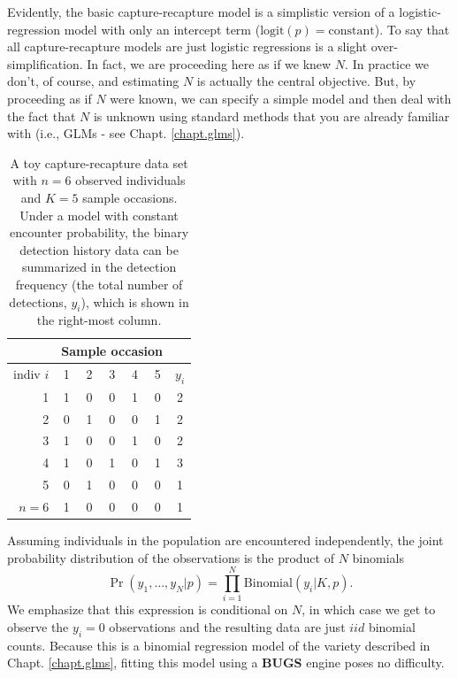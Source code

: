 Evidently, the basic capture-recapture model is a simplistic version
of a logistic-regression model with only an intercept term
($\mbox{logit}(p) = \mbox{constant}$).  To say that all
capture-recapture models are just logistic regressions is a 
slight over-simplification. In fact, we are proceeding here as if we knew
$N$.  In practice we don't, of course, and estimating $N$ is actually
the central objective.  But, by proceeding as if $N$ were known, we
can specify a simple model and then deal with the fact that $N$ is
unknown using standard methods that you are already familiar with
(i.e., GLMs - see Chapt. \ref{chapt.glms}).
\begin{table}[ht]
\centering
\caption{A toy capture-recapture data set with $n=6$ observed
  individuals and $K=5$ sample occasions. Under a model with constant encounter
  probability, the binary detection history data can be summarized in the detection frequency (the total number of detections, $y_i$), which is shown in the right-most column.
}
\begin{tabular}{r|ccccc|c}
\hline
&  \multicolumn{5}{c}{Sample occasion} &  \\ \hline
 indiv $i$ &  1 & 2 & 3 & 4 & 5 & $y_{i}$ \\ \hline
  1 &     1 & 0 & 0 & 1 & 0  & 2   \\
  2 &     0 & 1 & 0 & 0 & 1  & 2   \\
  3 &     1 & 0 & 0 & 1 & 0  & 2   \\
  4 &     1 & 0 & 1 & 0 & 1  & 3   \\
  5 &     0 & 1 & 0 & 0 & 0  & 1   \\
  $n=6$ & 1 & 0 & 0 & 0 & 0  & 1   \\ \hline
\end{tabular}
\label{closed.tab.3.1}
\end{table}


Assuming individuals in the population are encountered
 independently, the
joint probability distribution of the observations is the product of
$N$ binomials
\begin{equation}
  \Pr(y_1, \ldots, y_N | p) = \prod_{i=1}^N  \mathrm{Binomial}(y_i | K, p).
  \label{closed.eq.binNknown}
\end{equation}
We emphasize that this expression is conditional on $N$, in which
case we get to observe the $y_i=0$ observations and the resulting data
are just $iid$ binomial counts. Because this is a binomial regression
model of the variety described in Chapt. \ref{chapt.glms}, fitting this model using
a {\bf BUGS} engine poses no difficulty.


